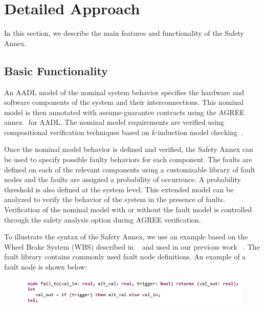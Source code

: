 \section{Detailed Approach}
\label{sec:detailed_approach}

In this section, we describe the main features and functionality of the Safety Annex.

\subsection{Basic Functionality}

An AADL model of the nominal system behavior specifies the hardware and software components of the system and their interconnections. This nominal model is then annotated with assume-guarantee contracts using the AGREE annex~\cite{NFM2012:CoGaMiWhLaLu} for AADL. The nominal model requirements are verified using compositional verification techniques based on $k$-induction model checking~\cite{2017arXiv171201222G}.

Once the nominal model behavior is defined and verified, the Safety Annex can be used to specify possible faulty behaviors for each component. The faults are defined on each of the relevant components using a customizable library of fault nodes and the faults are assigned a probability of occurrence. A probability threshold is also defined at the system level. This extended model can be analyzed to verify the behavior of the system in the presence of faults. Verification of the nominal model with or without the fault model is controlled through the safety analysis option during AGREE verification.

To illustrate the syntax of the Safety Annex, we use an example based on the Wheel Brake System (WBS) described in ~\cite{AIR6110} and used in our previous work ~\cite{Stewart17:IMBSA}.
The fault library contains commonly used fault node definitions. An example of a fault node is shown below:
\begin{figure}[h!]
	\vspace{-0.19in}
	\begin{center}
		\includegraphics[trim=0 9 0 5,clip,width=1.0\textwidth]{images/faultNode.png}
	\end{center}
	\vspace{-0.4in}
\end{figure}

